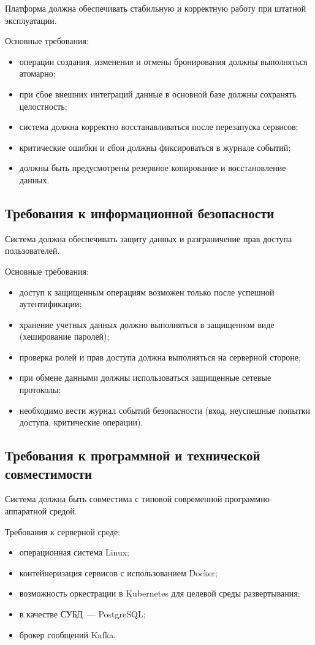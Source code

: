 Платформа должна обеспечивать стабильную и корректную работу при штатной эксплуатации.

Основные требования:
\begin{itemize}
\item операции создания, изменения и отмены бронирования должны выполняться атомарно;
\item при сбое внешних интеграций данные в основной базе должны сохранять целостность;
\item система должна корректно восстанавливаться после перезапуска сервисов;
\item критические ошибки и сбои должны фиксироваться в журнале событий;
\item должны быть предусмотрены резервное копирование и восстановление данных.
\end{itemize}

\subsection{Требования к информационной безопасности}

Система должна обеспечивать защиту данных и разграничение прав доступа пользователей.

Основные требования:
\begin{itemize}
\item доступ к защищенным операциям возможен только после успешной аутентификации;
\item хранение учетных данных должно выполняться в защищенном виде (хеширование паролей);
\item проверка ролей и прав доступа должна выполняться на серверной стороне;
\item при обмене данными должны использоваться защищенные сетевые протоколы;
\item необходимо вести журнал событий безопасности (вход, неуспешные попытки доступа, критические операции).
\end{itemize}

\subsection{Требования к программной и технической совместимости}

Система должна быть совместима с типовой современной программно-аппаратной средой.

Требования к серверной среде:
\begin{itemize}
\item операционная система Linux;
\item контейнеризация сервисов с использованием Docker;
\item возможность оркестрации в Kubernetes для целевой среды развертывания;
\item в качестве СУБД~--- PostgreSQL;
\item брокер сообщений Kafka.
\end{itemize}

